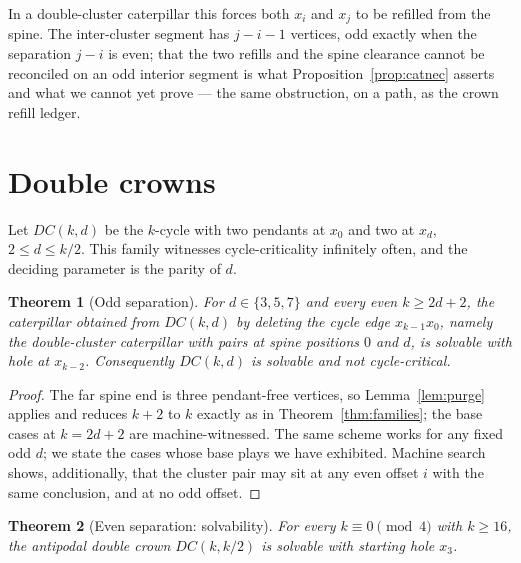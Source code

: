 \documentclass[11pt]{article}
\newtheorem{theorem}{Theorem}[section]
\theoremstyle{definition}
\begin{document}
In a double-cluster caterpillar this forces both $x_i$ and $x_j$ to
be refilled from the spine. The inter-cluster segment has
$j-i-1$ vertices, odd exactly when the separation $j-i$ is even; that
the two refills and the spine clearance cannot be reconciled on an
odd interior segment is what Proposition~\ref{prop:catnec} asserts and
what we cannot yet prove --- the same obstruction, on a path, as the
crown refill ledger.

\section{Double crowns}\label{sec:dc}

Let $DC(k,d)$ be the $k$-cycle with two pendants at $x_0$ and two at
$x_d$, $2\le d\le k/2$. This family witnesses cycle-criticality
infinitely often, and the deciding parameter is the parity of $d$.

\begin{theorem}[Odd separation]\label{thm:oddside}
For $d\in\{3,5,7\}$ and every even $k\ge 2d+2$, the caterpillar
obtained from $DC(k,d)$ by deleting the cycle edge $x_{k-1}x_0$,
namely the double-cluster caterpillar with pairs at spine positions
$0$ and $d$, is solvable with hole at $x_{k-2}$. Consequently
$DC(k,d)$ is solvable and not cycle-critical.
\end{theorem}

\begin{proof}
The far spine end is three pendant-free vertices, so
Lemma~\ref{lem:purge} applies and reduces $k+2$ to $k$ exactly as in
Theorem~\ref{thm:families}; the base cases at $k=2d+2$ are
machine-witnessed. The same scheme works for any fixed odd $d$; we
state the cases whose base plays we have exhibited. Machine search
shows, additionally, that the cluster pair may sit at any even
offset $i$ with the same conclusion, and at no odd offset.
\end{proof}

\begin{theorem}[Even separation: solvability]\label{thm:dcs}
For every $k\equiv 0\pmod 4$ with $k\ge 16$, the antipodal double
crown $DC(k,k/2)$ is solvable with starting hole $x_3$.
\end{theorem}
\end{document}
